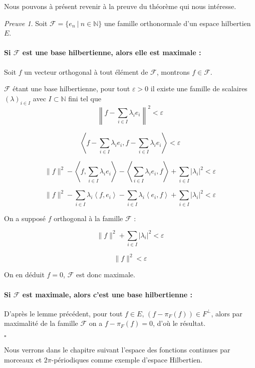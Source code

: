 \documentclass[]{article}
\theoremstyle{remark}
\newtheorem{myproof}{Preuve}
\theoremstyle{definition}
\newcommand{\cqfd}{
	\hfill$\square$
}
\begin{document}
	Nous pouvons à présent revenir à la preuve du théorème qui nous intéresse.
	
	\begin{myproof}
		Soit $\mathcal{F} = \{e_n ~ | ~ n \in \mathbb{N}\}$ une famille orthonormale d'un espace hilbertien $E$.
		
		\paragraph{Si $\mathcal{F}$ est une base hilbertienne, alors elle est maximale :}
		
		Soit $f$ un vecteur orthogonal à tout élément de $\mathcal{F}$, montrons $f \in \mathcal{F}$.
		
		$\mathcal{F}$ étant une base hilbertienne, pour tout $\varepsilon > 0$ il existe une famille de scalaires $(\lambda)_{i \in I}$ avec $I \subset \mathbb{N}$ fini tel que $$\left\|f - \sum_{i \in I} \lambda_i e_i\right\|^2 < \varepsilon$$
		
		$$\left\langle f - \sum_{i \in I} \lambda_i e_i, f - \sum_{i \in I} \lambda_i e_i \right\rangle < \varepsilon$$
		
		$$\|f\|^2 - \left\langle f, \sum_{i \in I} \lambda_i e_i \right\rangle - \left\langle \sum_{i \in I} \lambda_i e_i, f \right\rangle + \sum_{i \in I} |\lambda_i|^2 < \varepsilon$$
		
		$$\|f\|^2 - \sum_{i \in I} \lambda_i \left\langle f, e_i \right\rangle - \sum_{i \in I} \lambda_i \left\langle e_i, f \right\rangle + \sum_{i \in I} |\lambda_i|^2 < \varepsilon$$
		
		On a supposé $f$ orthogonal à la famille $\mathcal{F}$ :
		
		$$\|f\|^2 + \sum_{i \in I} |\lambda_i|^2 < \varepsilon$$
		
		$$\|f\|^2 < \varepsilon$$
		
		On en déduit $f = 0$, $\mathcal{F}$ est donc maximale.
		
		\paragraph{Si $\mathcal{F}$ est maximale, alors c'est une base hilbertienne :}
		
		D'après le lemme précédent, pour tout $f \in E$, $(f - \pi_F(f)) \in F^\bot$, alors par maximalité de la famille $\mathcal{F}$ on a $f - \pi_F(f) = 0$, d'où le résultat.
		
		\cqfd
	\end{myproof}
	
	Nous verrons dans le chapitre suivant l'espace des fonctions continues par morceaux et $2\pi$-périodiques comme exemple d'espace Hilbertien.
	
\end{document}
